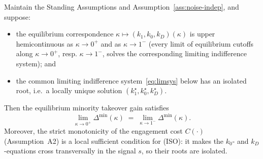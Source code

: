 \begin{lemma}\label{lem:endpoint}
Maintain the Standing Assumptions and Assumption~\ref{ass:noise-indep}, and
suppose:
\begin{itemize}
\item[\textup{(UHC)}] the equilibrium correspondence $\kappa\mapsto
(k_1,k_0,k_D)(\kappa)$ is upper hemicontinuous as $\kappa\to0^{+}$ and as
$\kappa\to1^{-}$ (every limit of equilibrium cutoffs along $\kappa\to0^{+}$, resp.
$\kappa\to1^{-}$, solves the corresponding limiting indifference system); and
\item[\textup{(ISO)}] the common limiting indifference
system~\eqref{eq:limsys} below has an isolated root, i.e.\ a locally unique
solution $(k_1^\star,k_0^\star,k_D^\star)$.
\end{itemize}
Then the equilibrium minority takeover gain satisfies
\[
   \lim_{\kappa\to0^{+}}\Delta^{\min}(\kappa)
   \;=\;\lim_{\kappa\to1^{-}}\Delta^{\min}(\kappa).
\]
Moreover, the strict monotonicity of the engagement cost $C(\cdot)$
(Assumption~A2) is a local sufficient condition for \textup{(ISO)}: it makes the
$k_0$- and $k_D$-equations cross transversally in the signal $s$, so their roots
are isolated.
\end{lemma}

